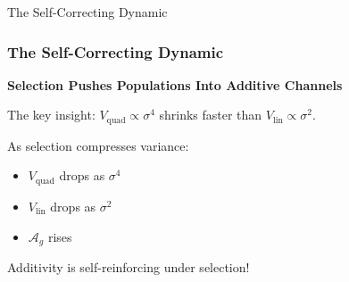 \documentclass[aspectratio=169,11pt]{beamer}
\newcommand{\Ag}{\mathcal{A}_g}
\newcommand{\Vlin}{V_{\mathrm{lin}}}
\newcommand{\Vquad}{V_{\mathrm{quad}}}
\begin{document}
\begin{frame}{The Self-Correcting Dynamic}
\frametitle{The Self-Correcting Dynamic}

\textbf{Selection Pushes Populations Into Additive Channels}

The key insight: $\Vquad \propto \sigma^4$ shrinks faster than $\Vlin \propto \sigma^2$.

As selection compresses variance:
\begin{itemize}
    \item $\Vquad$ drops as $\sigma^4$
    \item $\Vlin$ drops as $\sigma^2$
    \item $\Ag$ rises
\end{itemize}

\vspace{0.5cm}
\begin{alertblock}{}
Additivity is self-reinforcing under selection!
\end{alertblock}

\end{frame}
\end{document}
